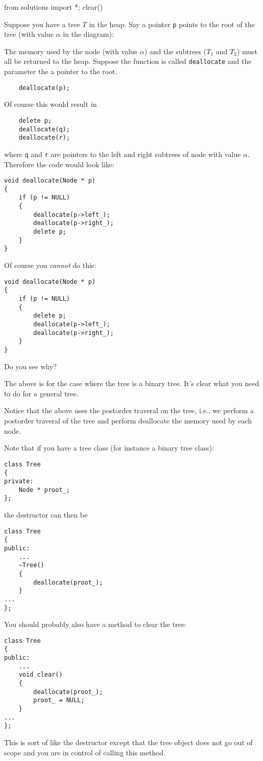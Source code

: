 \begin{python0}
from solutions import *; clear()
\end{python0}

Suppose you have a tree $T$ in the heap.
Say a pointer \verb!p! points to the root of the tree (with
value $\alpha$ in the diagram):



The memory used by the node (with value $\alpha$) and the
subtrees ($T_1$ and $T_2$) must all be returned to the heap.
Suppose the function is called \verb!deallocate! and the
parameter the a pointer to the root.
{\small
\begin{Verbatim}
    deallocate(p);
\end{Verbatim}
}
Of course this would result in
{\small
\begin{Verbatim}
    delete p;
    deallocate(q);
    deallocate(r);
\end{Verbatim}
}
where \verb!q! and \verb!r! are pointers to the left and right
subtrees of node with value $\alpha$.
Therefore the code would look like:
{\small
\begin{Verbatim}[frame=single]
void deallocate(Node * p)
{
    if (p != NULL)
    {
        deallocate(p->left_);
        deallocate(p->right_);
        delete p;
    }
}
\end{Verbatim}
}
Of course you \textit{cannot} do this:
{\small
\begin{Verbatim}[frame=single]
void deallocate(Node * p)
{
    if (p != NULL)
    {
        delete p;
        deallocate(p->left_);
        deallocate(p->right_);
    }
}
\end{Verbatim}
}
Do you see why?


The above is for the case where the tree is a binary tree.
It's clear what you need to do for a general tree.

Notice that the above uses the postorder traveral on the tree, i.e.,
we perform a postorder traveral of the tree and
perform deallocate the memory
used by each node.

Note that if you have a tree class (for instance a binary tree class):
{\small
\begin{Verbatim}[frame=single]
class Tree
{
private:
    Node * proot_;
};
\end{Verbatim}
}
the destructor can then be
{\small
\begin{Verbatim}[frame=single]
class Tree
{
public:
    ...
    ~Tree()
    {
        deallocate(proot_);
    }
...
};
\end{Verbatim}
}
You should probably also have a method to clear the tree:
{\small
\begin{Verbatim}[frame=single]
class Tree
{
public:
    ...
    void clear()
    {
        deallocate(proot_);
        proot_ = NULL;
    }
...
};
\end{Verbatim}
}
This is sort of like the destructor except that the tree object does not go out of
scope and you are in control of calling this method.

